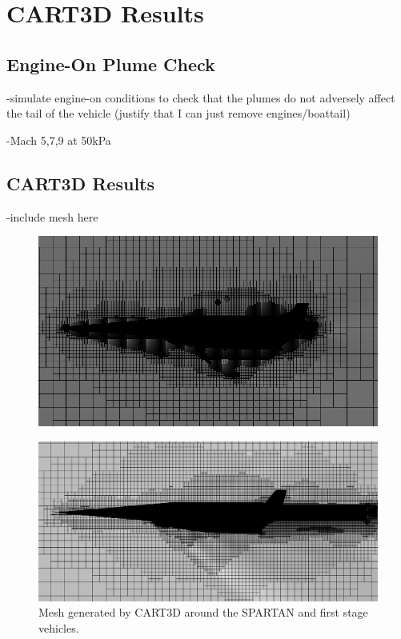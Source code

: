\chapter{CART3D Results}

\section{Engine-On Plume Check}
-simulate engine-on conditions to check that the plumes do not adversely affect the tail of the vehicle (justify that I can just remove engines/boattail)

-Mach 5,7,9 at 50kPa

\section{CART3D Results}
-include mesh here

\begin{figure}
	\centering
	\includegraphics[width=0.7\linewidth]{figures/3_vehicle_design/M3AoA6GRID}
	\caption{}
	\label{fig:M3AoA6GRID}
\end{figure}

		\begin{figure}
			\centering
			\includegraphics[width=0.7\linewidth]{figures/3_vehicle_design/CARTmesh}
			\caption{ Mesh generated by CART3D around the SPARTAN and first stage vehicles.}
			\label{fig:CARTmesh}
		\end{figure}
		
		
		
